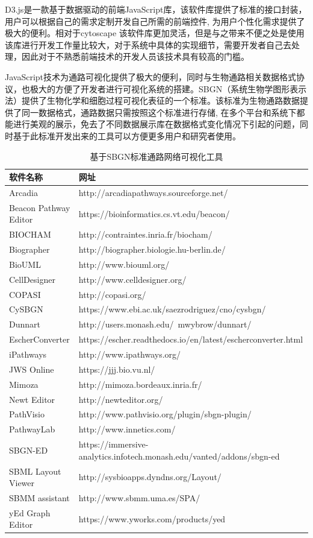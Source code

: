D3.js\cite{}是一款基于数据驱动的前端JavaScript库，该软件库提供了标准的接口封装，用户可以根据自己的需求定制开发自己所需的前端控件, 为用户个性化需求提供了极大的便利。相对于cytoscape 该软件库更加灵活，但是与之带来不便之处是使用该库进行开发工作量比较大，对于系统中具体的实现细节，需要开发者自己去处理，因此对于不熟悉前端技术的开发人员该技术具有较高的门槛。

JavaScript技术为通路可视化提供了极大的便利，同时与生物通路相关数据格式协议，也极大的方便了开发者进行可视化系统的搭建。SBGN\cite{}（系统生物学图形表示法）提供了生物化学和细胞过程可视化表征的一个标准。该标准为生物通路数据提供了同一数据格式，通路数据只需按照这个标准进行存储, 在多个平台和系统下都能进行美观的展示，免去了不同数据展示库在数据格式变化情况下引起的问题，同时基于此标准开发出来的工具可以方便更多用户和研究者使用。

\begin{table}[htbp]
  \centering
	\caption[table2]{基于SBGN标准通路网络可视化工具}
\vspace{0.5em}\wuhao
\begin{tabularx}{1.0\textwidth}{lX}
\toprule[1.5pt]
软件名称 & 网址 \\
\midrule[1pt]
Arcadia	 &  http://arcadiapathways.sourceforge.net/\\
Beacon Pathway Editor	 & https://bioinformatics.cs.vt.edu/beacon/\\
BIOCHAM	 & http://contraintes.inria.fr/biocham/\\
Biographer	 & http://biographer.biologie.hu-berlin.de/\\
BioUML	& http://www.biouml.org/\\
CellDesigner & http://www.celldesigner.org/\\
COPASI	& http://copasi.org/\\
CySBGN	 & https://www.ebi.ac.uk/saezrodriguez/cno/cysbgn/\\
Dunnart	 & http://users.monash.edu/~mwybrow/dunnart/\\
EscherConverter		& https://escher.readthedocs.io/en/latest/escherconverter.html\\
iPathways	 & http://www.ipathways.org/\\
JWS Online	& https://jjj.bio.vu.nl/\\
Mimoza	 & http://mimoza.bordeaux.inria.fr/\\
Newt Editor	& http://newteditor.org/\\
PathVisio	& http://www.pathvisio.org/plugin/sbgn-plugin/\\
PathwayLab	& http://www.innetics.com/\\
SBGN-ED	  & https://immersive-analytics.infotech.monash.edu/vanted/addons/sbgn-ed \\
SBML Layout Viewer	 & http://sysbioapps.dyndns.org/Layout/\\
SBMM assistant	 & http://www.sbmm.uma.es/SPA/\\
yEd Graph Editor	& https://www.yworks.com/products/yed\\

\bottomrule[1.5pt]
\end{tabularx}
\end{table}

